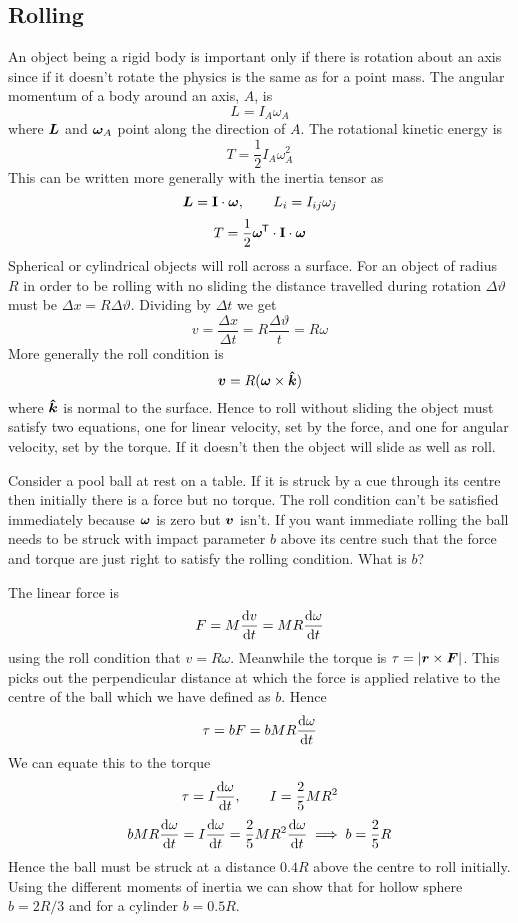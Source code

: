 \documentclass{article}
\newcommand{\mat}[1]{\mathbf{#1}}
\newcommand{\vk}{\vh k}
\begin{document}
    \subsection{Rolling}
    An object being a rigid body is important only if there is rotation about an axis since if it doesn't rotate the physics is the same as for a point mass.
    The angular momentum of a body around an axis, \(A\), is
    \[L = I_A\omega_A\]
    where \(\bm{L}\) and \(\bm{\omega}_A\) point along the direction of \(A\).
    The rotational kinetic energy is
    \[T = \frac{1}{2}I_A\omega_A^2\]
    This can be written more generally with the inertia tensor as
    \[\vv L = \mat I\cdot\vv\omega,\qquad L_i = I_{ij}\omega_j\]
    \[T = \frac{1}{2}\vv\omega\trans\cdot\mat I\cdot\vv\omega\]
    Spherical or cylindrical objects will roll across a surface.
    For an object of radius \(R\) in order to be rolling with no sliding the distance travelled during rotation \(\Delta\vartheta\) must be \(\Delta x = R\Delta\vartheta\).
    Dividing by \(\Delta t\) we get
    \[v = \frac{\Delta x}{\Delta t} = R\frac{\Delta\vartheta}{t} = R\omega\]
    More generally the roll condition is
    \[\vv v = R(\vv\omega\times\vk)\]
    where \(\vk\) is normal to the surface.
    Hence to roll without sliding the object must satisfy two equations, one for linear velocity, set by the force, and one for angular velocity, set by the torque.
    If it doesn't then the object will slide as well as roll.
    
    \example
    Consider a pool ball at rest on a table.
    If it is struck by a cue through its centre then initially there is a force but no torque.
    The roll condition can't be satisfied immediately because \(\bm{\omega}\) is zero but \(\bm{v}\) isn't.
    If you want immediate rolling the ball needs to be struck with impact parameter \(b\) above its centre such that the force and torque are just right to satisfy the rolling condition.
    What is \(b\)?
    
    The linear force is
    \[F = M\dv{v}{t} = MR\dv{\omega}{t}\]
    using the roll condition that \(v = R\omega\).
    Meanwhile the torque is \(\tau = |\bm{r}\times\bm{F}|\).
    This picks out the perpendicular distance at which the force is applied relative to the centre of the ball which we have defined as \(b\).
    Hence 
    \[\tau = bF = bMR\dv{\omega}{t}\]
    We can equate this to the torque
    \[\tau = I\dv{\omega}{t},\qquad I = \frac{2}{5}MR^2\]
    \[bMR\dv{\omega}{t} = I\dv{\omega}{t} = \frac{2}{5}MR^2\dv{\omega}{t}\implies b = \frac{2}{5}R\]
    Hence the ball must be struck at a distance \(0.4R\) above the centre to roll initially.
    Using the different moments of inertia we can show that for hollow sphere \(b = 2R/3\) and for a cylinder \(b = 0.5 R\).
    
\end{document}
